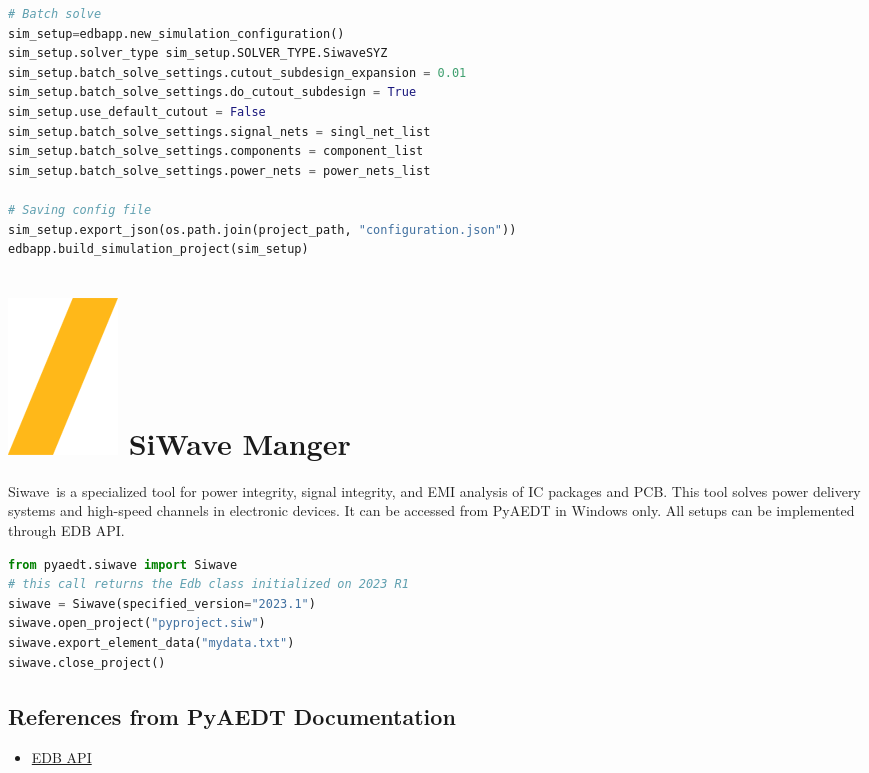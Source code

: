 \documentclass[landscape]{article}
\begin{document}
\begin{multicols}{3}
\begin{lstlisting}[language=Python]
# Batch solve
sim_setup=edbapp.new_simulation_configuration()
sim_setup.solver_type sim_setup.SOLVER_TYPE.SiwaveSYZ
sim_setup.batch_solve_settings.cutout_subdesign_expansion = 0.01
sim_setup.batch_solve_settings.do_cutout_subdesign = True
sim_setup.use_default_cutout = False
sim_setup.batch_solve_settings.signal_nets = singl_net_list
sim_setup.batch_solve_settings.components = component_list
sim_setup.batch_solve_settings.power_nets = power_nets_list

# Saving config file
sim_setup.export_json(os.path.join(project_path, "configuration.json"))
edbapp.build_simulation_project(sim_setup)
\end{lstlisting}
\section{\includegraphics[height=\fontcharht\font`\S]{slash.png} SiWave Manger}
Siwave is a specialized tool for power integrity, signal integrity, and EMI analysis of IC packages and PCB. This tool solves power delivery systems and high-speed channels in electronic devices. It can be accessed from PyAEDT in Windows only. All setups can be implemented through EDB API.
\begin{lstlisting}[language=Python]
from pyaedt.siwave import Siwave
# this call returns the Edb class initialized on 2023 R1
siwave = Siwave(specified_version="2023.1")
siwave.open_project("pyproject.siw")
siwave.export_element_data("mydata.txt")
siwave.close_project()
\end{lstlisting}


\subsection{References from PyAEDT Documentation}
\begin{itemize}
\item \href{https://aedt.docs.pyansys.com/version/stable/EDBAPI/index.html}{EDB API}
\end{itemize}
\end{multicols}
\vspace{-0.15cm}
\end{document}
